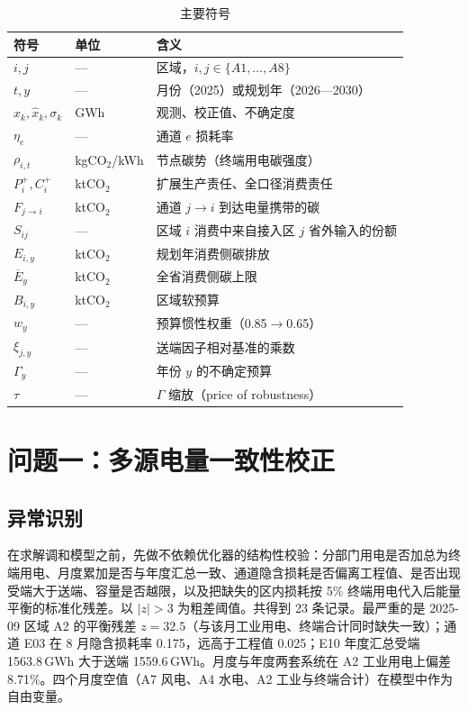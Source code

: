 \documentclass[UTF8,a4paper,zihao=-4,fontset=fandol]{ctexart}
\begin{document}
\begin{table}[htbp]
\centering
\caption{主要符号}
\label{tab:symbol}
\begin{tabular}{llp{7.6cm}}
\toprule
符号 & 单位 & 含义 \\
\midrule
$i,j$ & --- & 区域，$i,j\in\{A1,\ldots,A8\}$ \\
$t,y$ & --- & 月份（2025）或规划年（2026—2030） \\
$x_k,\hat x_k,\sigma_k$ & GWh & 观测、校正值、不确定度 \\
$\eta_e$ & --- & 通道 $e$ 损耗率 \\
$\rho_{i,t}$ & kgCO$_2$/kWh & 节点碳势（终端用电碳强度） \\
$P^+_i,C^+_i$ & ktCO$_2$ & 扩展生产责任、全口径消费责任 \\
$F_{j\to i}$ & ktCO$_2$ & 通道 $j\to i$ 到达电量携带的碳 \\
$S_{ij}$ & --- & 区域 $i$ 消费中来自接入区 $j$ 省外输入的份额 \\
$E_{i,y}$ & ktCO$_2$ & 规划年消费侧碳排放 \\
$\overline E_y$ & ktCO$_2$ & 全省消费侧碳上限 \\
$B_{i,y}$ & ktCO$_2$ & 区域软预算 \\
$w_y$ & --- & 预算惯性权重（0.85$\to$0.65） \\
$\xi_{j,y}$ & --- & 送端因子相对基准的乘数 \\
$\Gamma_y$ & --- & 年份 $y$ 的不确定预算 \\
$\tau$ & --- & $\Gamma$ 缩放（price of robustness） \\
\bottomrule
\end{tabular}
\end{table}

\section{问题一：多源电量一致性校正}

\subsection{异常识别}

在求解调和模型之前，先做不依赖优化器的结构性校验：分部门用电是否加总为终端用电、月度累加是否与年度汇总一致、通道隐含损耗是否偏离工程值、是否出现受端大于送端、容量是否越限，以及把缺失的区内损耗按 5\% 终端用电代入后能量平衡的标准化残差。以 $|z|>3$ 为粗差阈值。共得到 23 条记录。最严重的是 2025-09 区域 A2 的平衡残差 $z=32.5$（与该月工业用电、终端合计同时缺失一致）；通道 E03 在 8 月隐含损耗率 0.175，远高于工程值 0.025；E10 年度汇总受端 1563.8\,GWh 大于送端 1559.6\,GWh。月度与年度两套系统在 A2 工业用电上偏差 8.71\%。四个月度空值（A7 风电、A4 水电、A2 工业与终端合计）在模型中作为自由变量。
\end{document}
